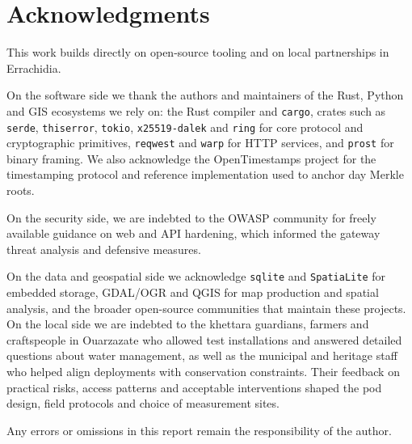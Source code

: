 \section*{Acknowledgments}

This work builds directly on open-source tooling and on local partnerships in
Errachidia.

On the software side we thank the authors and maintainers of the Rust, Python
and \ac{GIS} ecosystems we rely on: the Rust compiler and \texttt{cargo}, crates such
as \texttt{serde}, \texttt{thiserror}, \texttt{tokio}, \texttt{x25519-dalek} and
\texttt{ring} for core protocol and cryptographic primitives, \texttt{reqwest}
and \texttt{warp} for \ac{HTTP} services, and \texttt{prost} for binary framing.
We also acknowledge the OpenTimestamps project for the timestamping protocol and
reference implementation used to anchor day Merkle roots.

On the security side, we are indebted to the OWASP community for freely available
guidance on web and \ac{API} hardening, which informed the gateway threat analysis
and defensive measures.

On the data and geospatial side we acknowledge \texttt{sqlite} and
\texttt{SpatiaLite} for embedded storage, GDAL/OGR and Q\ac{GIS} for map production
and spatial analysis, and the broader open-source communities that maintain
these projects.
On the local side we are indebted to the khettara guardians, farmers and
craftspeople in Ouarzazate who allowed test installations and answered detailed
questions about water management, as well as the municipal and heritage staff
who helped align deployments with conservation constraints.
Their feedback on
practical risks, access patterns and acceptable interventions shaped the pod
design, field protocols and choice of measurement sites.

Any errors or omissions in this report remain the responsibility of the author.
